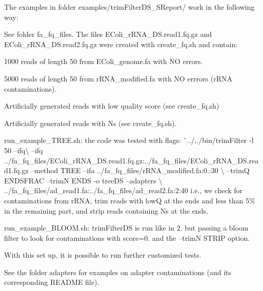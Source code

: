 The examples in folder {\ttfamily examples/trim\+Filter\+D\+S\+\_\+\+S\+Report/} work in the following way\+:
\begin{DoxyEnumerate}
\item See folder {\ttfamily fa\+\_\+fq\+\_\+files}. The files {\ttfamily E\+Coli\+\_\+r\+R\+N\+A\+\_\+\+D\+S.\+read1.\+fq.\+gz} and {\ttfamily E\+Coli\+\_\+r\+R\+N\+A\+\_\+\+D\+S.\+read2.\+fq.\+gz} were created with {\ttfamily create\+\_\+fq.\+sh} and contain\+:
\begin{DoxyItemize}
\item 1000 reads of length 50 from {\ttfamily E\+Coli\+\_\+genome.\+fa} with NO errors.
\item 5000 reads of length 50 from {\ttfamily r\+R\+N\+A\+\_\+modified.\+fa} with NO errrors (r\+R\+NA contaminations).
\item Artificially generated reads with low quality score (see {\ttfamily create\+\_\+fq.\+sh})
\item Artificially generated reads with Ns (see {\ttfamily create\+\_\+fq.\+sh}).
\end{DoxyItemize}
\item {\ttfamily run\+\_\+example\+\_\+\+T\+R\+E\+E.\+sh}\+: the code was tested with flags\+: \`{}../../bin/trim\+Filter -\/l 50 --ifq\textbackslash{} --ifq ../fa\+\_\+fq\+\_\+files/\+E\+Coli\+\_\+r\+R\+N\+A\+\_\+\+DS.read1.\+fq.\+gz\+:../fa\+\_\+fq\+\_\+files/\+E\+Coli\+\_\+r\+R\+N\+A\+\_\+\+DS.read1.\+fq.\+gz --method T\+R\+EE --ifa ../fa\+\_\+fq\+\_\+files/r\+R\+N\+A\+\_\+modified.fa\+:0.\+:30 \textbackslash{} --trimQ E\+N\+D\+S\+F\+R\+AC --trimN E\+N\+DS -\/o tree\+DS --adapters \textbackslash{} ../fa\+\_\+fq\+\_\+files/ad\+\_\+read1.fa\+:../fa\+\_\+fq\+\_\+files/ad\+\_\+read2.fa\+:2\+:40 i.\+e., we check for contaminations from r\+R\+NA, trim reads with lowQ at the ends and less than 5\% in the remaining part, and strip reads containing N\textquotesingle{}s at the ends.
\item {\ttfamily run\+\_\+example\+\_\+\+B\+L\+O\+O\+M.\+sh}\+: trim\+Filter\+DS is run like in 2. but passing a bloom filter to look for contaminations with {\ttfamily score=0.} and the --trimN S\+T\+R\+IP option.
\item With this set up, it is possible to run further customized tests.
\item See the folder {\ttfamily adapters} for examples on adapter contaminations (and its corresponding R\+E\+A\+D\+ME file).
\end{DoxyEnumerate}

